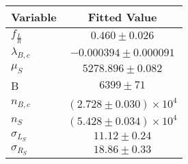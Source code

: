 \begin{tabular}[t]{lc}
\hline
Variable &Fitted Value\\
\hline\hline
$f_{\frac{L}{R}}$&$0.460\pm0.026$\\
\hline
$\lambda_{B,c}$&$-0.000394\pm0.000091$\\
\hline
$\mu_S$&$5278.896\pm0.082$\\
\hline
B&$6399\pm71$\\
\hline
$n_{B,c}$&$(2.728\pm0.030)\times 10^4$\\
\hline
$n_S$&$(5.428\pm0.034)\times 10^4$\\
\hline
$\sigma_{L_S}$&$11.12\pm0.24$\\
\hline
$\sigma_{R_S}$&$18.86\pm0.33$\\
\hline
\end{tabular}
